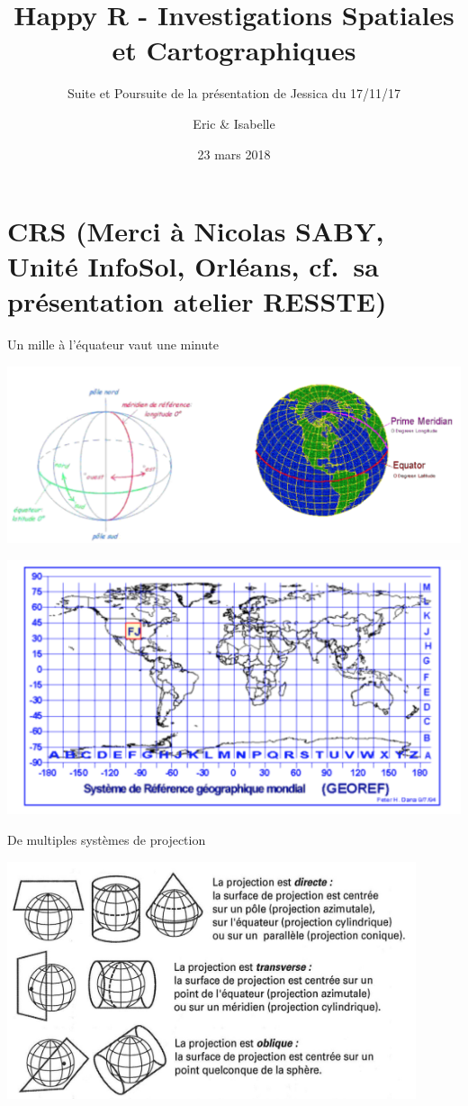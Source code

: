 \documentclass[8pt,ignorenonframetext,]{beamer}
\title{Happy R - Investigations Spatiales et Cartographiques}
\subtitle{Suite et Poursuite de la présentation de Jessica du 17/11/17}
\author{Eric \& Isabelle}
\date{23 mars 2018}
\begin{document}
\frame{\titlepage}

\section{CRS (Merci à Nicolas SABY, Unité InfoSol, Orléans, cf.~sa
présentation atelier
RESSTE)}\label{crs-merci-a-nicolas-saby-unite-infosol-orleans-cf.sa-presentation-atelier-resste}

\begin{frame}{Un mille à l'équateur vaut une minute}

\begin{center}
  \includegraphics[height=0.45\textheight]{figSaby1_1.png} 
\end{center}\begin{center}
  \includegraphics[height=0.4\textheight]{figSaby1_2.png}
\end{center}

\end{frame}

\begin{frame}{De multiples systèmes de projection}

\begin{center}
  \includegraphics[width=0.9\textwidth]{figSaby2.png} 
\end{center}

\end{frame}
\end{document}
